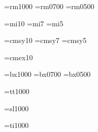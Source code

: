 %


\font\tenrm=\fontprefix rm1000 %
\font\sevenrm=\fontprefix rm0700
\font\fiverm=\fontprefix rm0500

\font\teni=\miprefix mi10 %
\font\seveni=\miprefix mi7
\font\fivei=\miprefix mi5

\font\tensy=cmsy10 %
\font\sevensy=cmsy7
\font\fivesy=cmsy5

\font\tenex=cmex10 %



\font\tenbf=\fontprefix bx1000 %
\font\sevenbf=\fontprefix bx0700
\font\fivebf=\fontprefix bx0500

\font\tentt=\fontprefix tt1000 %


\font\tensl=\fontprefix sl1000 %

\font\tenit=\fontprefix ti1000 %




